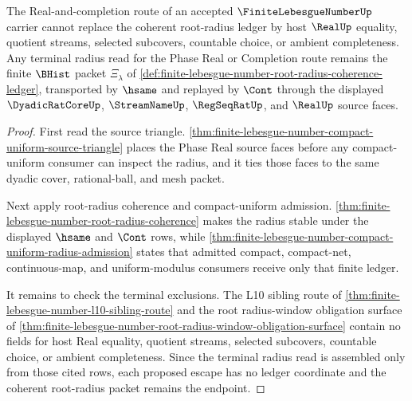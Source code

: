 \begin{theorem}
\label{thm:finite-lebesgue-number-real-completion-radius-nonescape}
The Real-and-completion route of an accepted $\FiniteLebesgueNumberUp$ carrier cannot replace the coherent root-radius ledger by host $\RealUp$ equality, quotient streams, selected subcovers, countable choice, or ambient completeness. Any terminal radius read for the Phase Real or Completion route remains the finite $\BHist$ packet $\Xi_{\lambda}$ of \autoref{def:finite-lebesgue-number-root-radius-coherence-ledger}, transported by $\hsame$ and replayed by $\Cont$ through the displayed $\DyadicRatCoreUp$, $\StreamNameUp$, $\RegSeqRatUp$, and $\RealUp$ source faces.
\end{theorem}
\begin{proof}
First read the source triangle. \autoref{thm:finite-lebesgue-number-compact-uniform-source-triangle} places the Phase Real source faces before any compact-uniform consumer can inspect the radius, and it ties those faces to the same dyadic cover, rational-ball, and mesh packet.

Next apply root-radius coherence and compact-uniform admission. \autoref{thm:finite-lebesgue-number-root-radius-coherence} makes the radius stable under the displayed $\hsame$ and $\Cont$ rows, while \autoref{thm:finite-lebesgue-number-compact-uniform-radius-admission} states that admitted compact, compact-net, continuous-map, and uniform-modulus consumers receive only that finite ledger.

It remains to check the terminal exclusions. The L10 sibling route of \autoref{thm:finite-lebesgue-number-l10-sibling-route} and the root radius-window obligation surface of \autoref{thm:finite-lebesgue-number-root-radius-window-obligation-surface} contain no fields for host Real equality, quotient streams, selected subcovers, countable choice, or ambient completeness. Since the terminal radius read is assembled only from those cited rows, each proposed escape has no ledger coordinate and the coherent root-radius packet remains the endpoint.
\end{proof}
